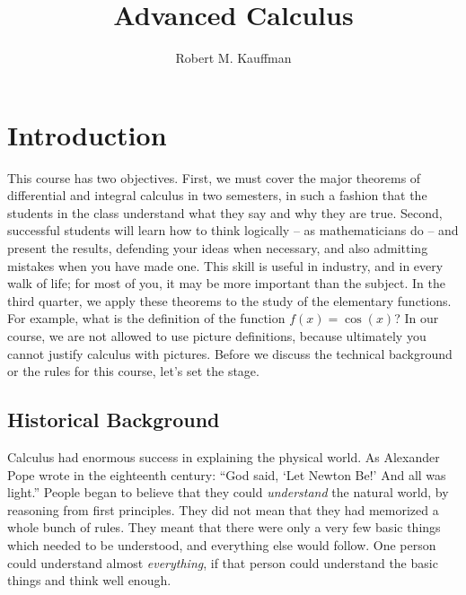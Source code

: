 \documentclass{article}
\let\titlepageAuthor\author
\renewcommand{\author}[1]{\newcommand{\headerAuthor}{#1}\titlepageAuthor{#1}}
\let\titlepageTitle\title
\renewcommand{\title}[1]{\newcommand{\headerTitle}{#1}\titlepageTitle{#1}}
\begin{document}
\title{Advanced Calculus}
\author{Robert M. Kauffman}
\date{ }
\maketitle
\thispagestyle{empty}



\newpage

\setcounter{tocdepth}{3} 
\tableofcontents
\thispagestyle{empty}


\newpage


\section{Introduction}


This course has two objectives. First, we must cover the major theorems of differential and integral calculus in two semesters, in such a fashion that the students in the class understand what they say and why they are true. Second, successful students will learn how to think logically -- as mathematicians do -- and present the results, defending your ideas when necessary, and also admitting mistakes when you have made one. This skill is useful in industry, and in every walk of life; for most of you, it may be more important than the subject. In the third quarter, we apply these theorems to the study of the elementary functions. For example, what is the definition of the function $f(x) = \cos(x)$? In our course, we are not allowed to use picture definitions, because ultimately you cannot justify calculus with pictures. Before we discuss the technical background or the rules for this course, let's set the stage.


\subsection{Historical Background}

Calculus had enormous success in explaining the physical world. As Alexander Pope wrote in the eighteenth century: ``God said, `Let Newton Be!' And all was light.'' People began to believe that they could \emph{understand} the natural world, by reasoning from first principles. They did not mean that they had memorized a whole bunch of rules. They meant that there were only a very few basic things which needed to be understood, and everything else would follow. One person could understand almost \emph{everything}, if that person could understand the basic things and think well enough.
\end{document}
